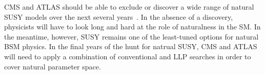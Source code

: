 \documentclass[12pt]{article}
\begin{document}
    CMS and ATLAS should be able to exclude or discover a wide range of natural SUSY models over the next several years~\cite{cornering}. In the absence of a discovery, physicists will have to look long and hard at the role of naturalness in the SM. In the meantime, however, SUSY remains one of the least-tuned options for natural BSM physics. In the final years of the hunt for natrual SUSY, CMS and ATLAS will need to apply a combination of conventional and LLP searches in order to cover natural parameter space.

\clearpage
\pagebreak
\singlespacing
{}

\end{document}
